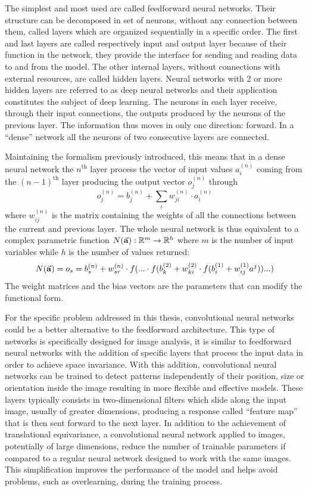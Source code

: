 \documentclass[a4paper,10pt]{report}
\begin{document}
The simplest and most used are called feedforward neural networks.
Their structure can be decomposed in set of neurons, without any connection between them, called layers which are
organized sequentially in a specific order.
The first and last layers are called respectively input and output layer because of
their function in the network, they provide the interface for sending and reading data to and from 
the model. The other internal layers, without connections with external resources, are called hidden layers.
Neural networks with 2 or more hidden layers are referred to as deep neural networks and their
application constitutes the subject of deep learning.
The neurons in each layer receive, through their input connections,
the outputs produced by the neurons of the previous layer.  The information thus moves in
only one direction: forward. In a ``dense'' network all the neurons of two consecutive layers
are connected.

Maintaining the formalism previously introduced, this means that in a dense 
neural network the $n^{\text{th}}$ layer process the vector of input values 
$a_i^{(n)}$ coming from the $(n-1)^{\text{th}}$ layer producing the output vector $o_j^{(n)}$ through
\begin{equation}
    o_j^{(n)} = b_j^{(n)} + \sum_i w^{(n)}_{ji}\cdot a^{(n)}_i
\end{equation}
where $w^{(n)}_{ij}$ is the matrix containing the weights of all the connections between the current and previous layer.
The whole neural network is thus equivalent to a complex parametric function $N (\va a): \mathbb{R}^m \rightarrow \mathbb{R}^h$ where $m$ is 
the number of input variables while $h$ is the number of values returned:
\begin{equation}
    N(\va a) = o_s = b_s^{(n)} + w^{(n)}_{sr} 
    \cdot f( ... \cdot f( b_k^{(2)} + w_{ki}^{(2)} \cdot f(b_i^{(1)} + w_{ij}^{(1)}a^j)) ... )
\end{equation}
The weight matrices and the bias vectors are the parameters that can modify the functional form.

For the specific problem addressed in this thesis, convolutional neural networks could be a better alternative 
to the feedforward architecture.
This type of networks is specifically designed for image analysis, 
it is similar to feedforward neural networks with the addition
of specific layers that process the input data in order to achieve 
space invariance. With this addition, convolutional neural networks can be trained
to detect patterns independently of their position, size or orientation inside the image
resulting in more flexible and effective models.
These layers typically consists in two-dimensional filters which slide along the input image, usually of greater dimensions, 
producing a response called ``feature map'' that is then sent forward to the next layer.
In addition to the achievement of translational equivariance, a convolutional neural network
applied to images, potentially of large dimensions, reduce the number of trainable parameters
if compared to a regular neural network designed to work with the same images. This simplification improves the
performance of the model and helps avoid problems, such as overlearning, during the training process.
\end{document}
